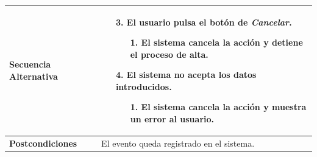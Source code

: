 \begin{longtable}{| p{4cm} | p{10cm} |}
\\
\hline
\textbf{Secuencia Alternativa} &\mbox{}\par\vspace{-\baselineskip}
\begin{enumerate}[leftmargin=0.9cm, topsep=0.1cm]
\item[3.] El usuario pulsa el botón de \textit{Cancelar}.
	\begin{itemize}
	\item[1.] El sistema cancela la acción y detiene el proceso de alta.
	\end{itemize}
\item[4.] El sistema no acepta los datos introducidos.
	\begin{itemize}
	\item[1.] El sistema cancela la acción y muestra un error al usuario.
	\end{itemize}
\end{enumerate}
\\

\hline
\textbf{Postcondiciones} & 
El evento queda registrado en el sistema.\\
\hline
\end{longtable}



\newpage
